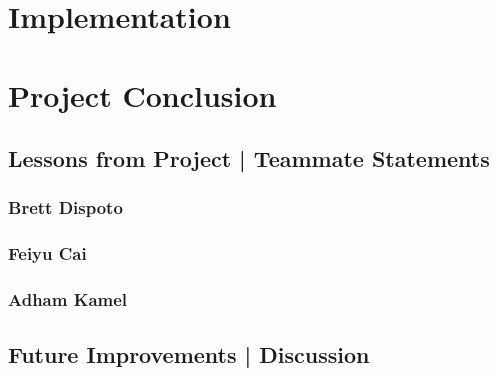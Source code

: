 \documentclass[letter, 12pt, titlepage]{article}
\begin{document}
\section{Implementation}


\section{Project Conclusion}
	
	\subsection{Lessons from Project | Teammate Statements}

	\subsubsection{Brett Dispoto}

	\subsubsection{Feiyu Cai}

	\subsubsection{Adham Kamel}

	\subsection{Future Improvements | Discussion}
\end{document}
